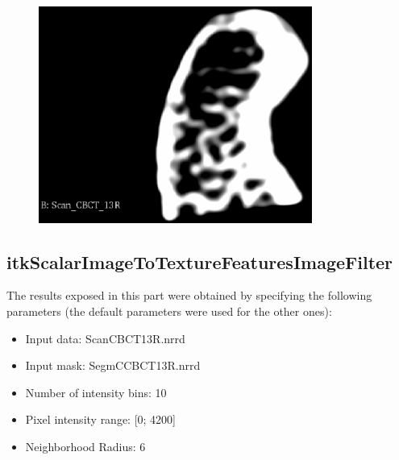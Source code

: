 \documentclass{InsightArticle}
\begin{document}
\begin{figure}[H]
  \begin{center}
    \includegraphics[width=0.8\textwidth]{figures/Scan.eps}
    \label{fig:Scan}
  \end{center}
\end{figure}

\subsection{itkScalarImageToTextureFeaturesImageFilter}
\label{coocResults}

The results exposed in this part were obtained by specifying the following parameters (the default parameters were used for the other ones):

\begin{itemize}
 \item Input data: Scan\textunderscore CBCT\textunderscore 13R.nrrd
 \item Input mask: SegmC\textunderscore CBCT\textunderscore 13R.nrrd
 \item Number of intensity bins: 10
 \item Pixel intensity range: [0; 4200]
 \item Neighborhood Radius: 6
\end{itemize}
\end{document}
